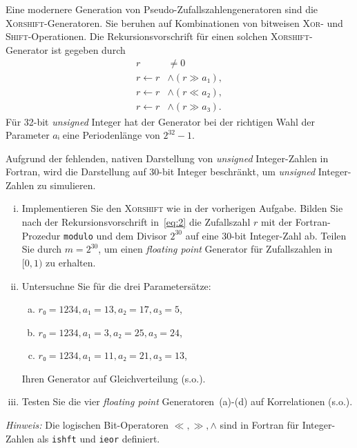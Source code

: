 \begin{question}[subtitle=\textsc{Xorshift}-Generatoren]
  Eine modernere Generation von Pseudo-Zufallszahlengeneratoren sind die \textsc{Xorshift}-Generatoren.
  Sie beruhen auf Kombinationen von bitweisen \textsc{Xor}- und \textsc{Shift}-Operationen.
  Die Rekursionsvorschrift für einen solchen \textsc{Xorshift}-Generator ist gegeben durch
  \begin{equation}
    \label{eq:2}
    \begin{split}
      r & ≠ 0 \\
      r ← r & ∧ (r ≫ a₁), \\
      r ← r & ∧ (r ≪ a₂), \\
      r ← r & ∧ (r ≫ a₃).
    \end{split}
  \end{equation}
  Für \num{32}-bit \textit{unsigned} Integer hat der Generator bei der richtigen Wahl der Parameter $aᵢ$ eine Periodenlänge von $2^{32} - 1$.

  Aufgrund der fehlenden, nativen Darstellung von \textit{unsigned} Integer-Zahlen in Fortran, wird die Darstellung auf \num{30}-bit Integer beschränkt, um \textit{unsigned} Integer-Zahlen zu simulieren.
  \begin{enumerate}[(i)]
  \item Implementieren Sie den \textsc{Xorshift} wie in der vorherigen Aufgabe.
    Bilden Sie nach der Rekursionsvorschrift in~\cref{eq:2} die Zufallszahl $r$ mit der Fortran-Prozedur \texttt{modulo} und dem Divisor $2^{30}$ auf eine 30-bit Integer-Zahl ab.
    Teilen Sie durch $m = 2^{30}$, um einen \textit{floating point} Generator für Zufallszahlen in $[0, 1)$ zu erhalten.
  \item Untersuchne Sie für die drei Parametersätze:
    \begin{enumerate}[(a)]
    \item\label{item:7} $r₀ = 1234, a₁ = 13, a₂ = 17, a₃ = 5$,
    \item\label{item:5} $r₀ = 1234, a₁ = 3, a₂ = 25, a₃ = 24$,
    \item\label{item:6} $r₀ = 1234, a₁ = 11, a₂ = 21, a₃ = 13$,
    \end{enumerate}
    Ihren Generator auf Gleichverteilung (s.o.).
  \item Testen Sie die vier \textit{floating point} Generatoren~(a)-(d) auf Korrelationen (s.o.).
  \end{enumerate}

  \textit{Hinweis:} Die logischen Bit-Operatoren $≪, ≫, ∧$ sind in Fortran für Integer-Zahlen als \texttt{ishft} und \texttt{ieor} definiert.
\end{question}

